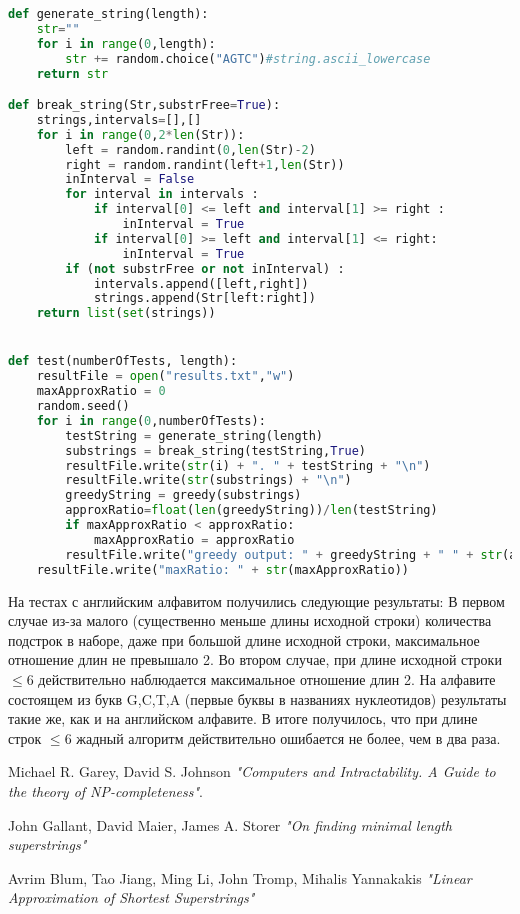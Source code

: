 \documentclass{article}
\begin{document}
\begin{lstlisting}[language=python]
def generate_string(length):
    str=""
    for i in range(0,length):
        str += random.choice("AGTC")#string.ascii_lowercase
    return str

def break_string(Str,substrFree=True):
    strings,intervals=[],[]
    for i in range(0,2*len(Str)):
        left = random.randint(0,len(Str)-2)
        right = random.randint(left+1,len(Str))
        inInterval = False
        for interval in intervals :
            if interval[0] <= left and interval[1] >= right :
                inInterval = True
            if interval[0] >= left and interval[1] <= right:
                inInterval = True
        if (not substrFree or not inInterval) :
            intervals.append([left,right])
            strings.append(Str[left:right])
    return list(set(strings))


def test(numberOfTests, length):
    resultFile = open("results.txt","w")
    maxApproxRatio = 0
    random.seed()
    for i in range(0,numberOfTests):
        testString = generate_string(length)
        substrings = break_string(testString,True)
        resultFile.write(str(i) + ". " + testString + "\n")
        resultFile.write(str(substrings) + "\n")
        greedyString = greedy(substrings)
        approxRatio=float(len(greedyString))/len(testString)
        if maxApproxRatio < approxRatio:
            maxApproxRatio = approxRatio
        resultFile.write("greedy output: " + greedyString + " " + str(approxRatio) + "\n")
    resultFile.write("maxRatio: " + str(maxApproxRatio))
\end{lstlisting}
На тестах с английским алфавитом получились следующие результаты:
В первом случае из-за малого (существенно меньше длины исходной строки) количества подстрок в наборе, даже при большой длине исходной строки, максимальное отношение длин не превышало 2.
Во втором случае, при длине исходной строки $\leq 6$ действительно наблюдается максимальное отношение длин 2.
На алфавите состоящем из букв G,C,T,A (первые буквы в названиях нуклеотидов) результаты такие же, как и на английском алфавите.
В итоге получилось, что при длине строк $\leq 6$ жадный алгоритм действительно ошибается не более, чем в два раза.

\begin{thebibliography}{}
Michael R. Garey, David S. Johnson 
\textit{"Computers and Intractability. A Guide to the theory of NP-completeness"}. 

John Gallant, David Maier, James A. Storer
\textit{"On finding minimal length superstrings"}

Avrim Blum, Tao Jiang, Ming Li, John Tromp, Mihalis Yannakakis 
\textit{"Linear Approximation of Shortest Superstrings"}
\end{thebibliography}
\end{document}
